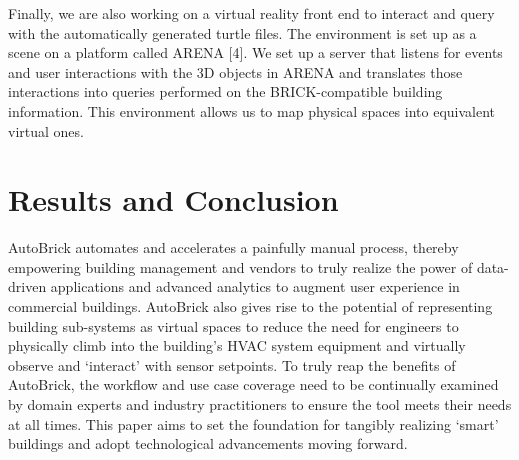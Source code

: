 \documentclass[twocolumn, switch]{article} %
\begin{document}
Finally, we are also working on a virtual reality front end to interact and
query with the automatically generated turtle files. The environment is set up
as a scene on a platform called ARENA [4]. We set up a server that listens for
events and user interactions with the 3D objects in ARENA and translates those
interactions into queries performed on the BRICK-compatible building
information. This environment allows us to map physical spaces into equivalent virtual ones.

\section{Results and Conclusion}
AutoBrick automates and accelerates a painfully manual process, thereby
empowering building management and vendors to truly realize the power of
data-driven applications and advanced analytics to augment user experience in
commercial buildings. AutoBrick also gives rise to the potential of
representing building sub-systems as virtual spaces to reduce the need for
engineers to physically climb into the building's HVAC system equipment and virtually observe and ‘interact’ with sensor setpoints. To truly reap the benefits of AutoBrick, the workflow and use case coverage need to be continually examined by domain experts and industry practitioners to ensure the tool meets their needs at all times. This paper aims to set the foundation for tangibly realizing ‘smart’ buildings and adopt technological advancements moving forward.



\end{document}
